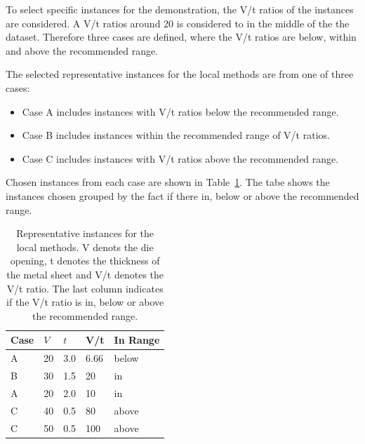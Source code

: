To select specific instances for the demonstration, the V/t ratios of the instances are considered.
A V/t ratios around 20 is considered to in the middle of the the dataset.
Therefore three cases are defined, where the V/t ratios are below, within and above the recommended range.

The selected representative instances for the local methods are from one of three cases:
\begin{itemize}
    \item Case A includes instances with V/t ratios below the recommended range.
    \item Case B includes instances within the recommended range of V/t ratios.
    \item Case C includes instances with V/t ratios above the recommended range.
\end{itemize}

Chosen instances from each case are shown in Table~\ref{tab:representative-instances}.
The tabe shows the instances chosen grouped by the fact if there in, below or above the recommended range.

\begin{table}[h]
    \begin{tcolorbox}[arc=0pt,boxrule=0.5pt]
        \centering
        \begin{tabular}{lllll}
            \toprule
            \textbf{Case} & \textbf{\(V\) } & \textbf{\(t\)} & \textbf{V/t} & \textbf{In Range} \\
            \toprule
            A             & 20              & 3.0            & 6.66         & below             \\
            \hdashline
            B             & 30              & 1.5            & 20           & in                \\
            A             & 20              & 2.0            & 10           & in                \\
            \hdashline
            C             & 40              & 0.5            & 80           & above             \\
            C             & 50              & 0.5            & 100          & above             \\
            \bottomrule
        \end{tabular}
    \end{tcolorbox}
    \caption{Representative instances for the local methods.
    V denots the die opening, t denotes the thickness of the metal sheet and V/t denotes the V/t ratio.
    The last column indicates if the V/t ratio is in, below or above the recommended range.}
    \label{tab:representative-instances}
\end{table}

